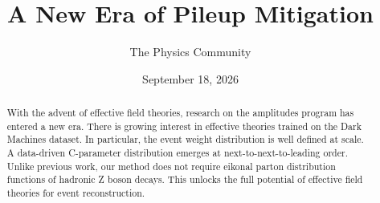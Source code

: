 \documentclass[11pt]{article}
\title{A New Era of Pileup Mitigation}
\author{The Physics Community}
\date{September 18, 2026}
\numberwithin{equation}{section}
\theoremstyle{definition}
\theoremstyle{remark}
\begin{document}
\maketitle
\begin{abstract}
With the advent of effective field theories, research on the amplitudes
program has entered a new era. There is growing interest in effective
theories trained on the Dark Machines dataset. In particular, the event
weight distribution is well defined at scale. A data-driven C-parameter
distribution emerges at next-to-next-to-leading order. Unlike previous
work, our method does not require eikonal parton distribution functions
of hadronic Z boson decays. This unlocks the full potential of effective
field theories for event reconstruction.
\end{abstract}
\tableofcontents





\nocite{*}


\end{document}
